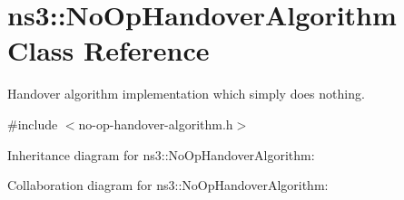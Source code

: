 \hypertarget{classns3_1_1NoOpHandoverAlgorithm}{}\section{ns3\+:\+:No\+Op\+Handover\+Algorithm Class Reference}
\label{classns3_1_1NoOpHandoverAlgorithm}


Handover algorithm implementation which simply does nothing.  




{\ttfamily \#include $<$no-\/op-\/handover-\/algorithm.\+h$>$}



Inheritance diagram for ns3\+:\+:No\+Op\+Handover\+Algorithm\+:


Collaboration diagram for ns3\+:\+:No\+Op\+Handover\+Algorithm\+:
